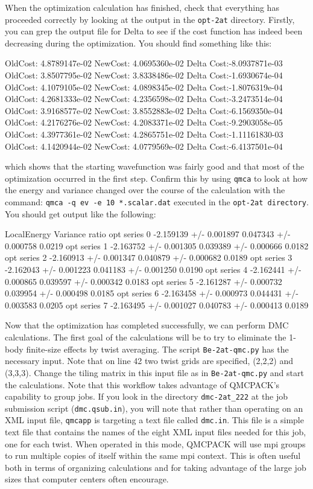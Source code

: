 When the optimization calculation has finished, check that everything has proceeded correctly by looking at the output in the \texttt{opt-2at} directory.  Firstly, you can grep the output file for Delta to see if the cost function has indeed been decreasing during the optimization.  You should find something like this:
\begin{shade}
 OldCost: 4.8789147e-02 NewCost: 4.0695360e-02 Delta Cost:-8.0937871e-03
 OldCost: 3.8507795e-02 NewCost: 3.8338486e-02 Delta Cost:-1.6930674e-04
 OldCost: 4.1079105e-02 NewCost: 4.0898345e-02 Delta Cost:-1.8076319e-04
 OldCost: 4.2681333e-02 NewCost: 4.2356598e-02 Delta Cost:-3.2473514e-04
 OldCost: 3.9168577e-02 NewCost: 3.8552883e-02 Delta Cost:-6.1569350e-04
 OldCost: 4.2176276e-02 NewCost: 4.2083371e-02 Delta Cost:-9.2903058e-05
 OldCost: 4.3977361e-02 NewCost: 4.2865751e-02 Delta Cost:-1.11161830-03
 OldCost: 4.1420944e-02 NewCost: 4.0779569e-02 Delta Cost:-6.4137501e-04
\end{shade}
which shows that the starting wavefunction was fairly good and that most of the optimization occurred in the first step.  Confirm this by using \texttt{qmca} to look at how the energy and variance changed over the course of the calculation with the command: \texttt{qmca -q ev -e 10 *.scalar.dat} executed in the \texttt{opt-2at directory}.  You should get output like the following:
\begin{shade}
                 LocalEnergy               Variance             ratio
opt  series 0  -2.159139 +/- 0.001897   0.047343 +/- 0.000758   0.0219 
opt  series 1  -2.163752 +/- 0.001305   0.039389 +/- 0.000666   0.0182 
opt  series 2  -2.160913 +/- 0.001347   0.040879 +/- 0.000682   0.0189 
opt  series 3  -2.162043 +/- 0.001223   0.041183 +/- 0.001250   0.0190 
opt  series 4  -2.162441 +/- 0.000865   0.039597 +/- 0.000342   0.0183 
opt  series 5  -2.161287 +/- 0.000732   0.039954 +/- 0.000498   0.0185 
opt  series 6  -2.163458 +/- 0.000973   0.044431 +/- 0.003583   0.0205 
opt  series 7  -2.163495 +/- 0.001027   0.040783 +/- 0.000413   0.0189 
\end{shade}

Now that the optimization has completed successfully, we can perform DMC calculations.  The first goal of the calculations will be to try to eliminate the 1-body finite-size effects by twist averaging.  The script \texttt{Be-2at-qmc.py} has the necessary input.  Note that on line 42 two twist grids are specified, (2,2,2) and (3,3,3).  Change the tiling matrix in this input file as in \texttt{Be-2at-qmc.py} and start the calculations.  Note that this workflow takes advantage of QMCPACK's capability to group jobs.  If you look in the directory \texttt{dmc-2at\_222} at the job submission script (\texttt{dmc.qsub.in}), you will note that rather than operating on an XML input file, \texttt{qmcapp} is targeting a text file called \texttt{dmc.in}.  This file is a simple text file that contains the names of the eight XML input files needed for this job, one for each twist.  When operated in this mode, QMCPACK will use mpi groups to run multiple copies of itself within the same mpi context.  This is often useful both in terms of organizing calculations and for taking advantage of the large job sizes that computer centers often encourage.

